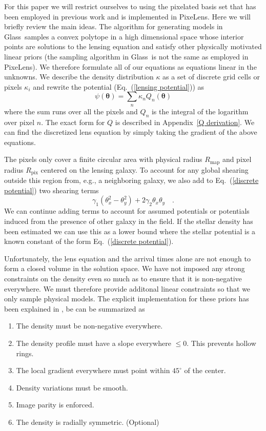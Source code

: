 \documentclass[onecolumn,galley]{mn2e}
\newcommand{\Glass}{{\sc Glass}}
\newcommand{\PixeLens}{{\sc PixeLens}}
\newcommand{\Rmap}{\ensuremath{R_\mathrm{map}}}
\newcommand{\Rpix}{\ensuremath{R_\mathrm{pix}}}
\newcommand{\eqnref}[1] {Eq.~(\ref{#1})}
\newcommand{\appref}[1] {Appendix~\ref{#1}}
\renewcommand{\vec}[1]{\ensuremath{\boldsymbol{#1}}}
\begin{document}
For this paper we will restrict ourselves to using the pixelated basis set that
has been employed in previous work and is implemented in \PixeLens. Here we
will briefly review the main ideas. The algorithm for generating models in
\Glass\ samples a convex polytope in a high dimensional space whose interior
points are solutions to the lensing equation and satisfy other physically
motivated linear priors (the sampling algorithm in \Glass\ is not the same as
employed in \PixeLens).  We therefore formulate all of our equations as
equations linear in the unknowns. We describe the density distribution $\kappa$
as a set of discrete grid cells or pixels $\kappa_i$ and rewrite the potential
(\eqnref{lensing potential}) as
%
\begin{equation}
  \psi(\vec\theta) = \sum_n \kappa_n Q_n(\vec\theta)
  \label{discrete potential}
\end{equation}
%
where the sum runs over all the pixels and $Q_n$ is the integral of the logarithm
over pixel $n$. The exact form for $Q$ is described in \appref{Q derivation}.
We can find the discretized lens equation by simply taking the gradient of the
above equations. 

The pixels only cover a finite circular area with physical radius $\Rmap$ and
pixel radius $\Rpix$ centered on the lensing galaxy. To account for any global
shearing outside this region from, e.g., a neighboring galaxy, we also add to
\eqnref{discrete potential} two shearing terms
%
\begin{equation}
\gamma_1(\theta_x^2 - \theta_y^2) + 2\gamma_2\theta_x\theta_y\quad.
\end{equation}
%
We can continue adding terms to account for assumed potentials or potentials
induced from the presence of other galaxy in the field. If the stellar density
has been estimated we can use this as a lower bound where the stellar potential
is a known constant of the form \eqnref{discrete potential}.
%
%

Unfortunately, the lens equation and the arrival times alone are not enough to form a
closed volume in the solution space. We have not imposed any strong constraints
on the density even so much as to ensure that it is non-negative everywhere. We
must therefore provide additonal linear constraints so that we only sample
physical models. The explicit implementation for these priors has been
explained in \cite{}, be can be summarized as
\begin{enumerate}
\item The density must be non-negative everywhere.
\item The density profile must have a slope everywhere $\le 0$. This prevents hollow rings.
\item The local gradient everywhere must point within $45^{\circ}$ of the center.
\item Density variations must be smooth.
\item Image parity is enforced.
\item The density is radially symmetric. (Optional)
\end{enumerate}
\end{document}
